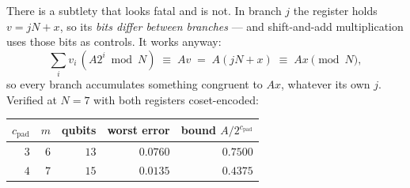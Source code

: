 \documentclass[11pt]{article}
\theoremstyle{plain}
\theoremstyle{remark}
\begin{document}
There is a subtlety that looks fatal and is not. In branch $j$ the register holds $v=jN+x$, so its
\emph{bits differ between branches} --- and shift-and-add multiplication uses those bits as
controls. It works anyway:
\[
\sum_i v_i\,(A2^i\bmod N)\;\equiv\;Av\;=\;A(jN+x)\;\equiv\;Ax \pmod N ,
\]
so every branch accumulates something congruent to $Ax$, whatever its own $j$. Verified at $N=7$
with both registers coset-encoded:

\begin{center}\small
\begin{tabular}{@{}rrrrr@{}}
\toprule
$c_{\mathrm{pad}}$ & $m$ & qubits & worst error & bound $A/2^{c_{\mathrm{pad}}}$\\
\midrule
$3$ & $6$ & $13$ & $0.0760$ & $0.7500$\\
$4$ & $7$ & $15$ & $0.0135$ & $0.4375$\\
\bottomrule
\end{tabular}
\end{center}
\end{document}
